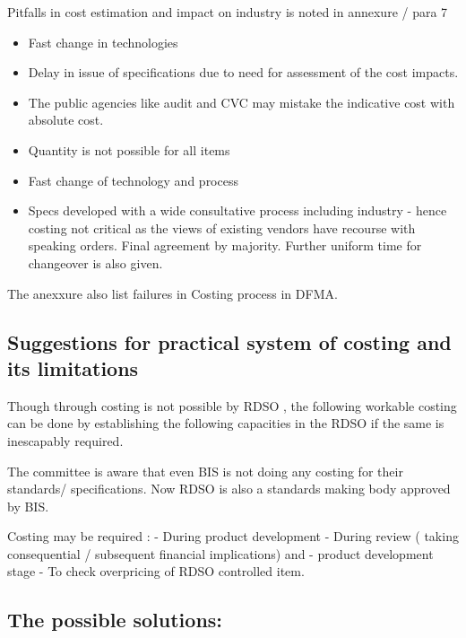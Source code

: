 \documentclass[
  10pt,
  twoside]{article}
\providecommand{\tightlist}{%
  \setlength{\itemsep}{0pt}\setlength{\parskip}{0pt}}
\begin{document}
Pitfalls in cost estimation and impact on industry is noted in annexure
/ para 7

\begin{itemize}
\tightlist
\item
  Fast change in technologies
\item
  Delay in issue of specifications due to need for assessment of the
  cost impacts.
\item
  The public agencies like audit and CVC may mistake the indicative cost
  with absolute cost.
\item
  Quantity is not possible for all items
\item
  Fast change of technology and process
\item
  Specs developed with a wide consultative process including industry -
  hence costing not critical as the views of existing vendors have
  recourse with speaking orders. Final agreement by majority. Further
  uniform time for changeover is also given.
\end{itemize}

The anexxure also list failures in Costing process in DFMA.

\hypertarget{suggestions-for-practical-system-of-costing-and-its-limitations}{%
\subsection{Suggestions for practical system of costing and its
limitations}\label{suggestions-for-practical-system-of-costing-and-its-limitations}}

Though through costing is not possible by RDSO , the following workable
costing can be done by establishing the following capacities in the RDSO
if the same is inescapably required.

The committee is aware that even BIS is not doing any costing for their
standards/ specifications. Now RDSO is also a standards making body
approved by BIS.

Costing may be required : - During product development - During review (
taking consequential / subsequent financial implications) and - product
development stage - To check overpricing of RDSO controlled item.

\hypertarget{the-possible-solutions}{%
\subsection{The possible solutions:}\label{the-possible-solutions}}
\end{document}
